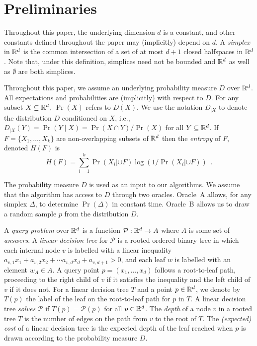 \documentclass{patmorin}
\begin{document}
\section{Preliminaries}

Throughout this paper, the underlying dimension $d$ is a constant, and
other constants defined throughout the paper may (implicitly) depend
on $d$.  A \emph{simplex} in $\mathbb{R}^d$ is the common intersection of a
set of at most $d+1$ closed halfspaces in $\mathbb{R}^d$. Note that, under this
definition, simplices need not be bounded and $\mathbb{R}^d$ as well as $\emptyset$ are both simplices.

Throughout this paper, we assume an underlying probability measure
$D$ over $\mathbb{R}^d$.  All expectations and probabilities are (implicitly)
with respect to $D$.  For any subset $X\subseteq\mathbb{R}^d$, $\Pr(X)$ refers
to $D(X)$.  We use the notation $D_{|X}$ to denote the distribution $D$
conditioned on $X$, i.e., $D_{|X}(Y)=\Pr(Y\mid X)=\Pr(X\cap Y)/\Pr(X)$
for all $Y\subseteq\mathbb{R}^d$.  If $F=\{X_1,\ldots,X_k\}$ are non-overlapping
subsets of $\mathbb{R}^d$ then the \emph{entropy} of $F$, denoted $H(F)$ is
\[
    H(F) = \sum_{i=1}^k \Pr(X_i|\cup F)\log(1/\Pr(X_i|\cup F)) \enspace .
\]

The probability measure $D$ is used as an input to our algorithms.
We assume that the algorithm has access to $D$ through two oracles.
Oracle~A allows, for any simplex $\Delta$, to determine $\Pr(\Delta)$
in constant time.  Oracle~B allows us to draw a random sample $p$ from
the distribution $D$.

A \emph{query problem} over $\mathbb{R}^d$ is a function
$\mathcal{P}:\mathbb{R}^d\rightarrow A$ where $A$ is some set of \emph{answers}.
A \emph{linear decision tree} for $\mathcal{P}$ is a rooted ordered
binary tree in which each internal node $v$ is labelled with a linear
inequality $a_{v,1}x_1 + a_{v,2}x_2 + \cdots a_{v,d}x_d + a_{v,d+1} > 0$,
and each leaf $w$ is labelled with an element $w_A\in A$.  A query point
$p=(x_1,\ldots,x_d)$ follows a root-to-leaf path, proceeding to the right
child of $v$ if it satisfies the inequality and the left child of $v$
if it does not.  For a linear decision tree $T$ and a point $p\in\mathbb{R}^d$,
we denote by $T(p)$ the label of the leaf on the root-to-leaf path
for $p$ in $T$.  A linear decision tree \emph{solves} $\mathcal{P}$ if
$T(p)=\mathcal{P}(p)$ for all $p\in\mathbb{R}^d$. The \emph{depth} of a node $v$
in a rooted tree $T$ is the number of edges on the path from $v$ to the
root of $T$.  The \emph{(expected) cost} of a linear decision tree is
the expected depth of the leaf reached when $p$ is drawn according to
the probability measure $D$.
\end{document}
